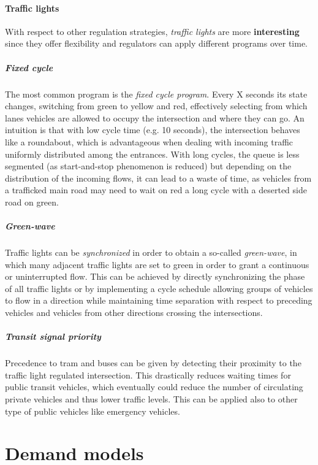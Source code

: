 \paragraph{Traffic lights}

With respect to other regulation strategies, \textit{traffic lights} are more \textbf{interesting} since they offer flexibility and regulators can apply different programs over time.

\subparagraph{Fixed cycle}

The most common program is the \textit{fixed cycle program}. Every X seconds its state changes, switching from green to yellow and red, effectively selecting from which lanes vehicles are allowed to occupy the intersection and where they can go. An intuition is that with low cycle time (e.g. 10 seconds), the intersection behaves like a roundabout, which is advantageous when dealing with incoming traffic uniformly distributed among the entrances. With long cycles, the queue is less segmented (as start-and-stop phenomenon is reduced) but depending on the distribution of the incoming flows, it can lead to a waste of time, as vehicles from a trafficked main road may need to wait on red a long cycle with a deserted side road on green.

\subparagraph{Green-wave}

Traffic lights can be \textit{synchronized} in order to obtain a so-called \textit{green-wave}, in which many adjacent traffic lights are set to green in order to grant a continuous or uninterrupted flow. This can be achieved by directly synchronizing the phase of all traffic lights or by implementing a cycle schedule allowing groups of vehicles to flow in a direction while maintaining time separation with respect to preceding vehicles and vehicles from other directions crossing the intersections.

\subparagraph{Transit signal priority}

Precedence to tram and buses can be given by detecting their proximity to the traffic light regulated intersection. This drastically reduces waiting times for public transit vehicles, which eventually could reduce the number of circulating private vehicles and thus lower traffic levels. This can be applied also to other type of public vehicles like emergency vehicles.

\section{Demand models}

